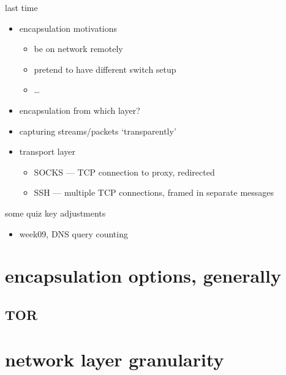 \date{}
\title{}
\date{}

\begin{frame}
    \titlepage
\end{frame}

\begin{frame}{last time}
    \begin{itemize}
    \item encapsulation motivations
        \begin{itemize}
        \item be on network remotely
        \item pretend to have different switch setup
        \item \ldots
        \end{itemize}
    \item encapsulation from which layer?
    \item capturing streams/packets `transparently'
    \item transport layer
        \begin{itemize}
        \item SOCKS --- TCP connection to proxy, redirected
        \item SSH --- multiple TCP connections, framed in separate messages
        \end{itemize}
    \end{itemize}
\end{frame}

\begin{frame}{some quiz key adjustments}
    \begin{itemize}
    \item week09, DNS query counting
    \end{itemize}
\end{frame}

\section{encapsulation options, generally}


\subsection{TOR}

\section{network layer granularity}

